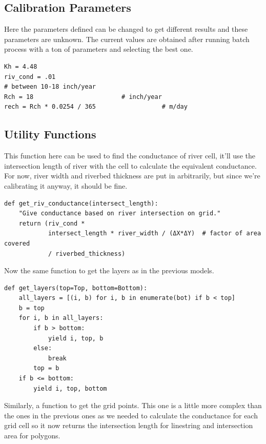 \documentclass[titlepage,12pt]{unisubmission}
\begin{document}
\subsection{Calibration Parameters}
\label{sec:orgaa40f3d}

Here the parameters defined can be changed to get different results and these parameters are unknown. The current values are obtained after running batch process with a ton of parameters and selecting the best one.

\begin{verbatim}
Kh = 4.48
riv_cond = .01
# between 10-18 inch/year
Rch = 18                        # inch/year
rech = Rch * 0.0254 / 365                  # m/day
\end{verbatim}

\subsection{Utility Functions}
\label{sec:orgb358ca4}

This function here can be used to find the conductance of river cell, it'll use the intersection length of river with the cell to calculate the equivalent conductance. For now, river width and riverbed thickness are put in arbitrarily, but since we're calibrating it anyway, it should be fine.

\begin{verbatim}
def get_riv_conductance(intersect_length):
    "Give conductance based on river intersection on grid."
    return (riv_cond *
            intersect_length * river_width / (ΔX*ΔY)  # factor of area covered
            / riverbed_thickness)
\end{verbatim}

Now the same function to get the layers as in the previous models.

\begin{verbatim}
def get_layers(top=Top, bottom=Bottom):
    all_layers = [(i, b) for i, b in enumerate(bot) if b < top]
    b = top
    for i, b in all_layers:
        if b > bottom:
            yield i, top, b
        else:
            break
        top = b
    if b <= bottom:
        yield i, top, bottom
\end{verbatim}


Similarly, a function to get the grid points. This one is a little more complex than the ones in the previous ones as we needed to calculate the conductance for each grid cell so it now returns the intersection length for linestring and intersection area for polygons.
\end{document}

